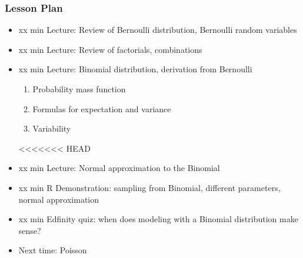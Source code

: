 \begin{frame}
    \frametitle{Lesson Plan}
    \begin{itemize}
        \item xx min Lecture: Review of Bernoulli distribution, Bernoulli random variables
        \item xx min Lecture: Review of factorials, combinations
        \item xx min Lecture: Binomial distribution, derivation from Bernoulli
        \begin{enumerate}
            \item Probability mass function
            \item Formulas for expectation and variance
            \item Variability
        \end{enumerate}
<<<<<<< HEAD
        \item xx min Lecture: Normal approximation to the Binomial
        \item xx min R Demonstration: sampling from Binomial, different parameters, normal approximation
        \item xx min Edfinity quiz: when does modeling with a Binomial distribution make sense?
        \item Next time: Poisson
    \end{itemize}
\end{frame}

    
